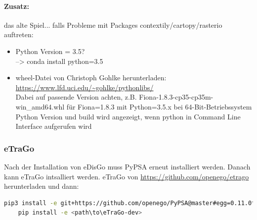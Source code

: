 \documentclass[
a4paper,     %
12pt         %
]{scrartcl}  %
\begin{document}
\paragraph{Zusatz:} das alte Spiel... falls Probleme mit Packages contextily/cartopy/rasterio auftreten:

\begin{itemize}
	\item Python Version = 3.5?
	\\--> conda install python=3.5
	\item wheel-Datei von Christoph Gohlke herunterladen: \url{https://www.lfd.uci.edu/~gohlke/pythonlibs/}\\
	Dabei auf passende Version achten, z.B. Fiona-1.8.3-cp35-cp35m-win\_amd64.whl für Fiona=1.8.3 mit Python=3.5.x bei 64-Bit-Betriebssystem\\
	Python Version und build wird angezeigt, wenn python in Command Line Interface aufgerufen wird
\end{itemize}

\subsubsection{eTraGo}
Nach der Installation von eDisGo muss PyPSA erneut installiert werden. Danach kann eTraGo intsalliert werden. eTraGo von \url{https://github.com/openego/etrago} herunterladen und dann:
\begin{lstlisting}[language=bash]
	pip3 install -e git+https://github.com/openego/PyPSA@master#egg=0.11.0fork
	pip install -e <path\to\eTraGo-dev>
\end{lstlisting}



\end{document}
